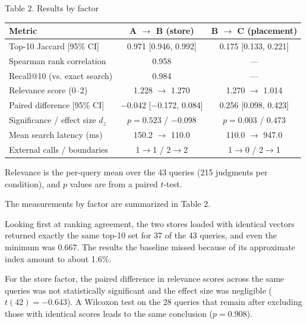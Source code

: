 \documentclass[10pt,a4paper,twocolumn]{article}
\newcommand{\pgsubsec}[1]{\par\vspace{4pt}{\bfseries\fontsize{12}{14}\selectfont #1}\par\nobreak\vspace{1pt}\nobreak}
\begin{document}
\pgsubsec{3.2 Experimental Results}

\begin{table}[t]
\centering
{\fontsize{8}{9.6}\selectfont Table 2. Results by factor}
\vspace{4pt}

\fontsize{6.9}{8.1}\selectfont
\setlength{\tabcolsep}{2pt}
\begin{tabular}{@{}lcc@{}}
\toprule
Metric & A $\rightarrow$ B (store) & B $\rightarrow$ C (placement) \\
\midrule
Top-10 Jaccard [95\% CI] & 0.971 [0.946, 0.992] & 0.175 [0.133, 0.221] \\
Spearman rank correlation & 0.958 & --- \\
Recall@10 (vs. exact search) & 0.984 & --- \\
Relevance score (0--2) & 1.228 $\rightarrow$ 1.270 & 1.270 $\rightarrow$ 1.014 \\
Paired difference [95\% CI] & $-$0.042 [$-$0.172, 0.084] & 0.256 [0.098, 0.423] \\
Significance / effect size $d_z$ & $p = 0.523$ / $-$0.098 & $p = 0.003$ / 0.473 \\
Mean search latency (ms) & 150.2 $\rightarrow$ 110.0 & 110.0 $\rightarrow$ 947.0 \\
External calls / boundaries & 1$\rightarrow$1 / 2$\rightarrow$2 & 1$\rightarrow$0 / 2$\rightarrow$1 \\
\bottomrule
\end{tabular}

\vspace{4pt}
{\fontsize{6.9}{8.1}\selectfont Relevance is the per-query mean over the 43 queries (215 judgments per condition), and $p$ values are from a paired $t$-test.}
\end{table}

The measurements by factor are summarized in Table 2.

Looking first at ranking agreement, the two stores loaded with identical vectors returned exactly the same top-10 set for 37 of the 43 queries, and even the minimum was 0.667. The results the baseline missed because of its approximate index amount to about 1.6\%.

For the store factor, the paired difference in relevance scores across the same queries was not statistically significant and the effect size was negligible ($t(42) = -0.643$). A Wilcoxon test on the 28 queries that remain after excluding those with identical scores leads to the same conclusion ($p = 0.908$).
\end{document}
